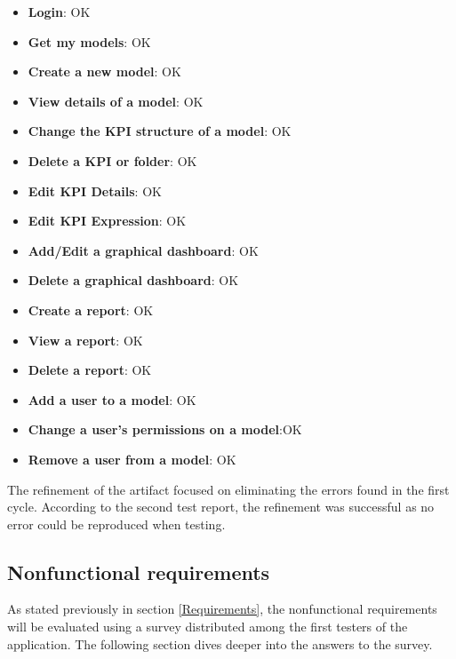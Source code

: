 \begin{itemize}
    \item \textbf{Login}: \textcolor{mutedGreen}{OK}
    \item \textbf{Get my models}: \textcolor{mutedGreen}{OK}
    \item \textbf{Create a new model}: \textcolor{mutedGreen}{OK}
    \item \textbf{View details of a model}: \textcolor{mutedGreen}{OK}
    \item \textbf{Change the KPI structure of a model}: \textcolor{mutedGreen}{OK}
    \item \textbf{Delete a KPI or folder}: \textcolor{mutedGreen}{OK}
    \item \textbf{Edit KPI Details}: \textcolor{mutedGreen}{OK}
    \item \textbf{Edit KPI Expression}: \textcolor{mutedGreen}{OK}
    \item \textbf{Add/Edit a graphical dashboard}: \textcolor{mutedGreen}{OK}
    \item \textbf{Delete a graphical dashboard}: \textcolor{mutedGreen}{OK}
    \item \textbf{Create a report}: \textcolor{mutedGreen}{OK}
    \item \textbf{View a report}: \textcolor{mutedGreen}{OK}
    \item \textbf{Delete a report}: \textcolor{mutedGreen}{OK}
    \item \textbf{Add a user to a model}: \textcolor{mutedGreen}{OK}
    \item \textbf{Change a user's permissions on a model}:\textcolor{mutedGreen}{OK}
    \item \textbf{Remove a user from a model}: \textcolor{mutedGreen}{OK}
\end{itemize}

The refinement of the artifact focused on eliminating the errors found in the first cycle. 
According to the second test report, the refinement was successful as no error could be reproduced when testing.

\subsection{Nonfunctional requirements}

As stated previously in section \ref{Requirements}, the nonfunctional requirements will be evaluated using a survey distributed among the first testers of the application. 
The following section dives deeper into the answers to the survey. 

